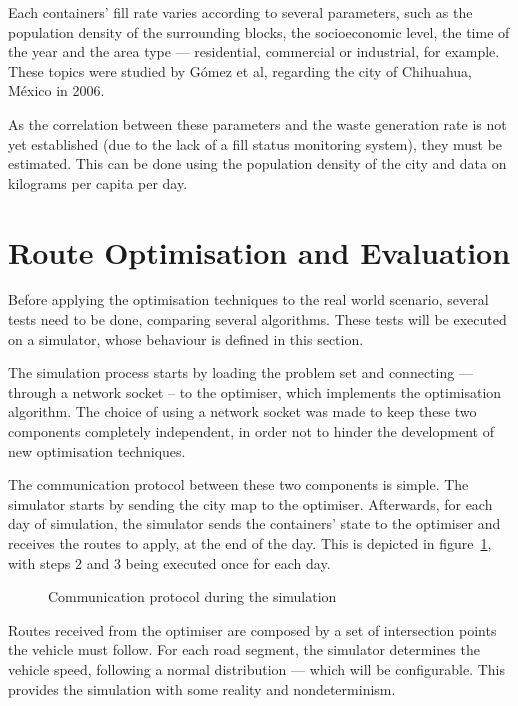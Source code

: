 Each containers' fill rate varies according to several parameters, such as the
population density of the surrounding blocks, the socioeconomic level, the time
of the year and the area type --- residential, commercial or industrial, for
example. These topics were studied by Gómez et al, regarding the city of
Chihuahua, México in 2006\citep{Gomez20092018,Gomez20082465}.

As the correlation between these parameters and the waste generation rate is
not yet established (due to the lack of a fill status monitoring system), they
must be estimated. This can be done using the population density of the city
and data on kilograms per capita per day.








\section{Route Optimisation and Evaluation}
\label{section:simulation}

Before applying the optimisation techniques to the real world scenario, several
tests need to be done, comparing several algorithms. These tests will be
executed on a simulator, whose behaviour is defined in this section.

The simulation process starts by loading the problem set and connecting ---
through a network socket -- to the optimiser, which implements the optimisation
algorithm. The choice of using a network socket was made to keep these two
components completely independent, in order not to hinder the development of
new optimisation techniques.

The communication protocol between these two components is simple. The
simulator starts by sending the city map to the optimiser. Afterwards, for each
day of simulation, the simulator sends the containers' state to the optimiser
and receives the routes to apply, at the end of the day. This is depicted in
figure~\ref{fig:protocol}, with steps 2 and 3 being executed once for each day.

\begin{figure}[th]
\centering

\caption{Communication protocol during the simulation}
\label{fig:protocol}
\end{figure}

Routes received from the optimiser are composed by a set of intersection
points the vehicle must follow. For each road segment, the simulator
determines the vehicle speed, following a normal distribution --- which will
be configurable. This provides the simulation with some reality and
nondeterminism. 


